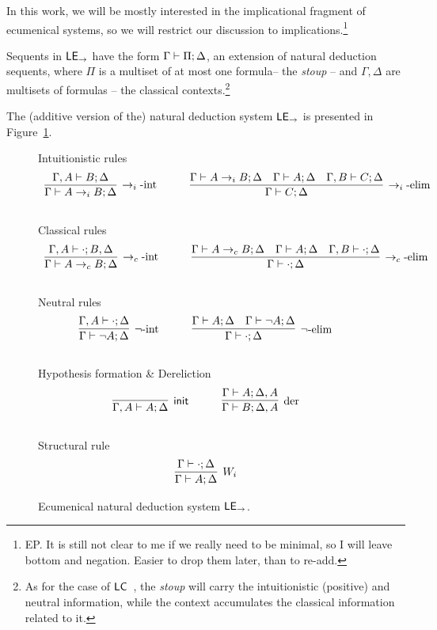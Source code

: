 
In this work, we will be mostly interested in the implicational fragment of ecumenical systems, so we will restrict our discussion to implications.\footnote{EP. It is still not clear to me if we really need to be minimal, so I will leave bottom and negation. Easier to drop them later, than to re-add.}

Sequents in $\mathsf{LE}_{\to}$ have the form $\Gamma\vdash\Pi;\Delta$, an extension of natural deduction sequents, where $\Pi$ is a multiset of at most one formula-- the {\em stoup} -- and  $\Gamma,\Delta$ are multisets of formulas -- the classical contexts.\footnote{As for the case of $\mathsf{LC}$~\cite{DBLP:journals/mscs/Girard91}, the {\em stoup} will carry the intuitionistic (positive) and neutral information, while the context accumulates the classical information related to it.}  

The (additive version of the) natural deduction system $\mathsf{LE}_{\to}$  is presented in Figure~\ref{fig:LEi}. 

\begin{figure}[ht]
{\sc Intuitionistic rules}
\[
\begin{array}{lc@{\qquad}l}
\infer[{\iimp\mbox{-int}}]{\stp{\Gamma}{A\iimp B}{\Delta}}{\stp{\Gamma,A}{B}{\Delta}}
& &
\infer[{\iimp\mbox{-elim}}]{\stp{\Gamma}{C}{\Delta}}{\stp{\Gamma}{A\iimp B}{\Delta} &
\stp{\Gamma}{A}{\Delta} & \stp{\Gamma,B}{C}{\Delta}}
\end{array}
\]
\\[5pt]
{\sc Classical rules}
\[
\begin{array}{lc@{\qquad}l}
\infer[{\cimp\mbox{-int}}]{\stp{\Gamma}{A\cimp B}{\Delta}}{\stp{\Gamma,A}{\cdot}{B,\Delta}}
& &
\infer[{\cimp\mbox{-elim}}]{\stp{\Gamma}{\cdot}{\Delta}}{\stp{\Gamma}{A\cimp B}{\Delta} &
\stp{\Gamma}{A}{\Delta} & \stp{\Gamma,B}{\cdot}{\Delta}}
\end{array}
\]
\\[5pt]
{\sc Neutral rules}
\[
\begin{array}{lc@{\qquad}l}
\infer[{\neg\mbox{-int}}]{\stp{\Gamma}{\neg A}{\Delta}}{\stp{\Gamma,A}{\cdot}{\Delta}}
& &
\infer[{\neg\mbox{-elim}}]{\stp{\Gamma}{\cdot}{\Delta}}{\stp{\Gamma}{A}{\Delta} &
\stp{\Gamma}{\neg A}{\Delta}}
\end{array}
\]
\\[5pt]
{\sc Hypothesis formation \& Dereliction}
\[
\begin{array}{lc@{\qquad}l}
\infer[\init]{\stp{\Gamma,A}{A}{\Delta}}{}
& &
\infer[\mbox{der}]{\stp{\Gamma}{B}{\Delta,A}}{\stp{\Gamma}{A}{\Delta,A}}
\end{array}
\]
\\[5pt]
{\sc Structural rule} 
\[
\begin{array}{lc@{\qquad}lc@{\qquad}l}
\infer[W_i]{\stp{\Gamma}{A}{\Delta}}{\stp{\Gamma}{\cdot}{\Delta}} 
\end{array}
\]
\caption{Ecumenical natural deduction system $\mathsf{LE}_{\to}$.}\label{fig:LEi}
\end{figure}

